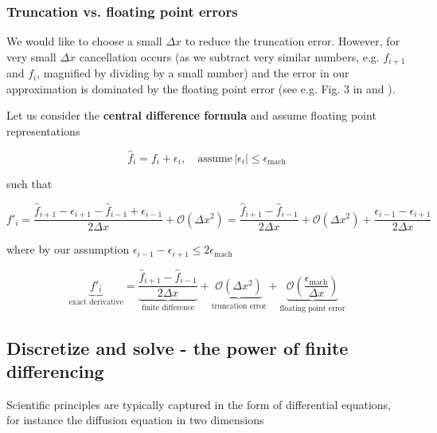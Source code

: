 \subsubsection{Truncation vs. floating point errors}

We would like to choose a small $\Delta x$ to reduce the truncation error. However, for very
small $\Delta x$ cancellation occurs (as we subtract very similar numbers,
e.g. $f_{i+1}$ and $f_{i}$, magnified by dividing by a small number) 
and the error in our approximation is dominated by the floating 
point error (see e.g. Fig. 3 in \cite{baydin18} and \cite{sauer25}).

Let us consider the \textbf{central difference formula} and assume
floating point representations

\begin{equation}
    \hat{f}_i = f_i + \epsilon_i, \quad \text{assume} \, |\epsilon_i| \leq \epsilon_\text{mach}
\end{equation}

such that

\begin{equation}
    f'_i = \frac{\hat{f}_{i+1} - \epsilon_{i + 1} - \hat{f}_{i-1} + \epsilon_{i - 1}}{2 \Delta x} + \mathcal{O}(\Delta x^2) = \frac{\hat{f}_{i+1} - \hat{f}_{i-1}}{2 \Delta x} + \mathcal{O}(\Delta x^2) + \frac{\epsilon_{i - 1} - \epsilon_{i + 1}}{2\Delta x}
\end{equation}

where by our assumption $\epsilon_{i - 1} - \epsilon_{i + 1} \leq 2\epsilon_\text{mach}$

\begin{equation}
    \underbrace{f'_i}_{\text{exact derivative}} = \underbrace{\frac{\hat{f}_{i+1} - \hat{f}_{i-1}}{2 \Delta x}}_{\text{finite difference}} + \underbrace{\mathcal{O}(\Delta x^2)}_{\text{truncation error}} + \underbrace{\mathcal{O}(\frac{\epsilon_\text{mach}}{\Delta x})}_{\text{floating point error}}
\end{equation}


\subsection{Discretize and solve - the power of finite differencing}

Scientific principles are typically captured in the form of differential equations, for 
instance the diffusion equation in two dimensions

